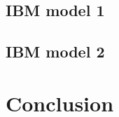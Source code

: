 \documentclass[11pt]{article}
\begin{document}
\subsection{IBM model 1}

\subsection{IBM model 2}

\section{Conclusion}
\end{document}

